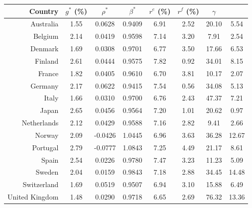 {\renewcommand{\arraystretch}{1.0}
\begin{table}[!ht]
\begin{center}
\begin{tabular}{rccccccc}
\hline
\hline
Country & $g^{*}$ (\%) & $\rho^{*}$ & $\beta^{*}$ & $r^{e}$ (\%) & $r^{f}$ (\%) & \underline{$\gamma$} & \boldsymbol{$\gamma$}\\
\hline

Australia & 1.55 & 0.0628 & 0.9409 & 6.91 & 2.52 & 20.10 & 5.54\\ 

Belgium & 2.14 & 0.0419 & 0.9598 & 7.14 & 3.20 & 7.91 &  2.54\\ 

Denmark & 1.69 & 0.0308 & 0.9701 & 6.77 & 3.50 & 17.66 &  6.53\\ 

Finland & 2.61 & 0.0444 & 0.9575 & 7.82 & 0.92 & 34.01 &  8.15\\ 

France & 1.82 & 0.0405 & 0.9610 & 6.70 & 3.81 & 10.17 &  2.07\\ 

Germany & 2.17 & 0.0622 & 0.9415 & 7.54 & 0.56 & 34.08 &  5.13\\ 

Italy & 1.66 & 0.0310 & 0.9700 & 6.76 & 2.43 & 47.37 &  7.21\\ 

Japan & 2.65 & 0.0456 & 0.9564 & 7.20 & 1.01 & 20.62 &  0.97\\ 

Netherlands & 2.12 & 0.0429 & 0.9588 & 7.16 & 2.82 & 9.41 &  2.66\\ 

Norway & 2.09 & -0.0426 & 1.0445 & 6.96 & 3.63 & 36.28 &  12.67\\ 

Portugal & 2.79 & -0.0777 & 1.0843 & 7.25 & 4.49 & 21.17 &  8.61\\ 

Spain & 2.54 & 0.0226 & 0.9780 & 7.47 & 3.23 & 11.23 &  5.09\\ 

Sweden & 2.04 & 0.0159 & 0.9843 & 7.18 & 2.88 & 34.45 &  14.48\\ 

Switzerland & 1.69 & 0.0519 & 0.9507 & 6.94 & 3.10 & 15.88 &  6.49\\ 

United Kingdom & 1.48 & 0.0290 & 0.9718 & 6.65 & 2.69 & 76.32 &  13.36\\ 


\end{tabular}
\end{center}
\end{table}}
